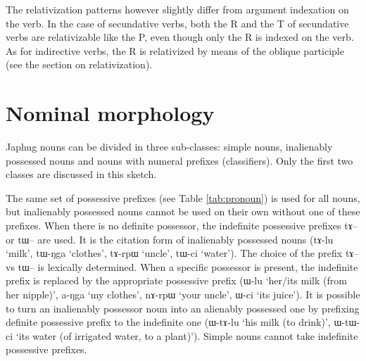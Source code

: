 \documentclass[oldfontcommands,oneside,a4paper,11pt]{article}
\newcommand{\ipa}[1]{{\phon #1}} %
\begin{document}
The relativization patterns however slightly differ from argument indexation on the verb.
In the case of secundative verbs, both the R and the T of secundative verbs are relativizable like the P, even though only the R is indexed on the verb. As for indirective verbs, the R is relativized by means of the oblique participle (see the section on relativization).

\section{Nominal morphology}
Japhug nouns can be divided in three sub-classes: simple nouns, inalienably possessed nouns and nouns with numeral prefixes (classifiers). Only the first two classes are discussed in this sketch. 

The same set of possessive prefixes (see Table \ref{tab:pronoun}) is used for all nouns, but inalienably possessed nouns cannot be used on their own without one of these prefixes. When there is no definite possessor, the indefinite possessive prefixes \ipa{tɤ--} or \ipa{tɯ--} are used. It is the citation form of inalienably possessed nouns (\ipa{tɤ-lu} `milk', \ipa{tɯ-ŋga} `clothes', \ipa{tɤ-rpɯ} `uncle', \ipa{tɯ-ci} `water'). The choice of the prefix \ipa{tɤ--} vs \ipa{tɯ--} is lexically determined.  When a specific possessor is present, the indefinite prefix is replaced by the appropriate possessive prefix (\ipa{ɯ-lu} `her/its milk (from her nipple)', \ipa{a-ŋga} `my clothes', \ipa{nɤ-rpɯ} `your uncle', \ipa{ɯ-ci} `its juice'). It is possible to turn an inalienably possessor noun into an alienably possessed one by prefixing definite possessive prefix to the indefinite one (\ipa{ɯ-tɤ-lu} `his milk (to drink)', \ipa{ɯ-tɯ-ci} `its water (of irrigated water, to a plant)'). Simple nouns cannot take indefinite possessive prefixes.
\end{document}
